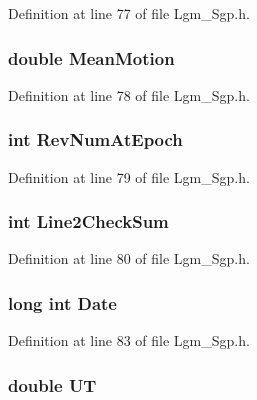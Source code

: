 Definition at line 77 of file Lgm\_\-Sgp.h.\hypertarget{struct___sgp_t_l_e_a8230c8489edeb8a5e009088180c9d12}{
\subsubsection[{MeanMotion}]{\setlength{\rightskip}{0pt plus 5cm}double {\bf MeanMotion}}}
\label{struct___sgp_t_l_e_a8230c8489edeb8a5e009088180c9d12}




Definition at line 78 of file Lgm\_\-Sgp.h.\hypertarget{struct___sgp_t_l_e_f19e71600e08a125e2e15bb43663cb63}{
\subsubsection[{RevNumAtEpoch}]{\setlength{\rightskip}{0pt plus 5cm}int {\bf RevNumAtEpoch}}}
\label{struct___sgp_t_l_e_f19e71600e08a125e2e15bb43663cb63}




Definition at line 79 of file Lgm\_\-Sgp.h.\hypertarget{struct___sgp_t_l_e_3630c8fcee279a2fa0698fa9b7748cf3}{
\subsubsection[{Line2CheckSum}]{\setlength{\rightskip}{0pt plus 5cm}int {\bf Line2CheckSum}}}
\label{struct___sgp_t_l_e_3630c8fcee279a2fa0698fa9b7748cf3}




Definition at line 80 of file Lgm\_\-Sgp.h.\hypertarget{struct___sgp_t_l_e_8c1b7b17183e48a6fafaf6302e1b1da9}{
\subsubsection[{Date}]{\setlength{\rightskip}{0pt plus 5cm}long int {\bf Date}}}
\label{struct___sgp_t_l_e_8c1b7b17183e48a6fafaf6302e1b1da9}




Definition at line 83 of file Lgm\_\-Sgp.h.\hypertarget{struct___sgp_t_l_e_729fdcc4d138ef63b0baba5e9af8da26}{
\subsubsection[{UT}]{\setlength{\rightskip}{0pt plus 5cm}double {\bf UT}}}
\label{struct___sgp_t_l_e_729fdcc4d138ef63b0baba5e9af8da26}




